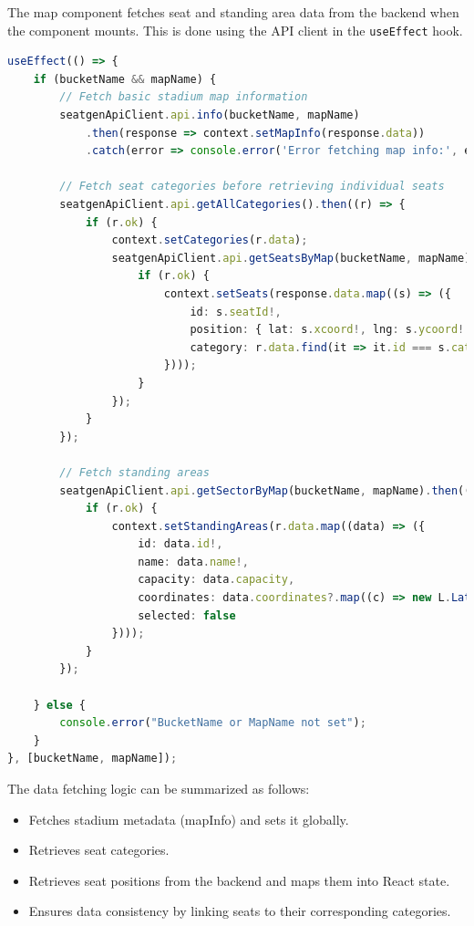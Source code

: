 The map component fetches seat and standing area data from the backend when the component mounts. This is done using the API client in the \texttt{useEffect} hook.

\begin{lstlisting}[language=TypeScript, caption=Fetching Seat and Category Data, label=lst:fetch-seats]
useEffect(() => {
    if (bucketName && mapName) {
        // Fetch basic stadium map information
        seatgenApiClient.api.info(bucketName, mapName)
            .then(response => context.setMapInfo(response.data))
            .catch(error => console.error('Error fetching map info:', error));

        // Fetch seat categories before retrieving individual seats
        seatgenApiClient.api.getAllCategories().then((r) => {
            if (r.ok) {
                context.setCategories(r.data);
                seatgenApiClient.api.getSeatsByMap(bucketName, mapName).then(response => {
                    if (r.ok) {
                        context.setSeats(response.data.map((s) => ({
                            id: s.seatId!,
                            position: { lat: s.xcoord!, lng: s.ycoord! },
                            category: r.data.find(it => it.id === s.categoryId) ?? null
                        })));
                    }
                });
            }
        });

        // Fetch standing areas
        seatgenApiClient.api.getSectorByMap(bucketName, mapName).then((r) => {
            if (r.ok) {
                context.setStandingAreas(r.data.map((data) => ({
                    id: data.id!,
                    name: data.name!,
                    capacity: data.capacity,
                    coordinates: data.coordinates?.map((c) => new L.LatLng(c.x!, c.y!)) ?? [],
                    selected: false
                })));
            }
        });

    } else {
        console.error("BucketName or MapName not set");
    }
}, [bucketName, mapName]);
\end{lstlisting}

The data fetching logic can be summarized as follows:

\begin{itemize}
    \item Fetches stadium metadata (mapInfo) and sets it globally.
    \item Retrieves seat categories.
    \item Retrieves seat positions from the backend and maps them into React state.
    \item Ensures data consistency by linking seats to their corresponding categories.
\end{itemize}


